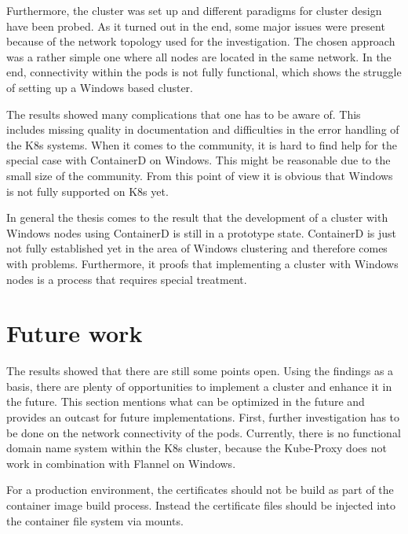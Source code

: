 Furthermore, the cluster was set up and different paradigms for cluster design have been probed. As it turned out in the end, some major issues were present because of the network topology used for the investigation. The chosen approach was a rather simple one where all nodes are located in the same network. In the end, connectivity within the pods is not fully functional, which shows the struggle of setting up a \ac{Windows} based cluster.

The results showed many complications that one has to be aware of. This includes missing quality in documentation and difficulties in the error handling of the \ac{K8s} systems. When it comes to the community, it is hard to find help for the special case with ContainerD on \ac{Windows}. This might be reasonable due to the small size of the community. From this point of view it is obvious that \ac{Windows} is not fully supported on \ac{K8s} yet.





In general the thesis comes to the result that the development of a cluster with \ac{Windows} nodes using ContainerD is still in a prototype state. ContainerD is just not fully established yet in the area of \ac{Windows} clustering and therefore comes with problems. Furthermore, it proofs that implementing a cluster with \ac{Windows} nodes is a process that requires special treatment. 


\section{Future work}
The results showed that there are still some points open. Using the findings as a basis, there are plenty of opportunities to implement a cluster and enhance it in the future. This section mentions what can be optimized in the future and provides an outcast for future implementations.
First, further investigation has to be done on the network connectivity of the pods. Currently, there is no functional domain name system within the \ac{K8s} cluster, because the Kube-Proxy does not work in combination with Flannel on \ac{Windows}.

For a production environment, the certificates should not be build as part of the container image build process. Instead the certificate files should be injected into the container file system via mounts.

